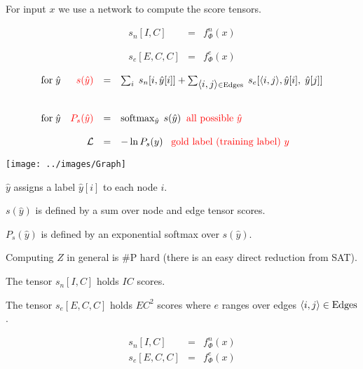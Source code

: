 {

For input $x$ we use a network to compute the score tensors.

\vfill
\begin{eqnarray*}
s_n[I,C] & = & f^n_\Phi(x) \\
\\
\\
s_e[E,C,C] & = & f^e_\Phi(x)
\end{eqnarray*}


$$\begin{array}{lrcl}
\mbox{for}\;\hat{y} & {\color{red} s(\hat{y})} & = & \sum_i\;s_n[i,\hat{y}[i]] + \sum_{{\mbox{$\langle i,j\rangle$}} \in \mathrm{Edges}}\;s_e[{\mbox{$\langle i,j\rangle$}},\hat{y}[i],\;\hat{y}[j]] \\
\\
\\
\mbox{for}\;\hat{y} & {\color{red} P_s(\hat{y})} & = & \operatorname*{softmax}_{\hat{y}}\;s(\hat{y}) \;\;\mbox{\color{red} all possible $\hat{y}$} \\
\\
 & {\cal L} & = & - \ln P_s(y) \;\;\;{\color{red} \mbox{gold label (training label) $y$}}
\end{array}$$

\centerline{\texttt{[image: ../images/Graph]}}
\medskip
$\hat{y} $ assigns a label $\hat{y}[i]$ to each node $i$.

\vfill
$s(\hat{y})$ is defined by a sum over node and edge tensor scores.

\vfill
$P_s(\hat{y})$ is defined by an exponential softmax over $s(\hat{y})$.

\vfill
Computing $Z$ in general is \#P hard (there is an easy direct reduction from SAT).


The tensor {\color{red} $s_n[I,C]$} holds $IC$ scores.

\vfill
The tensor {\color{red} $s_e[E,C,C]$} holds $EC^2$ scores where $e$ ranges over edges ${\mbox{$\langle i,j\rangle$}} \in \mathrm{Edges}$.


\begin{eqnarray*}
s_n[I,C] & = & f^n_\Phi(x) \\
s_e[E,C,C] & = & f^e_\Phi(x)
\end{eqnarray*}

}
